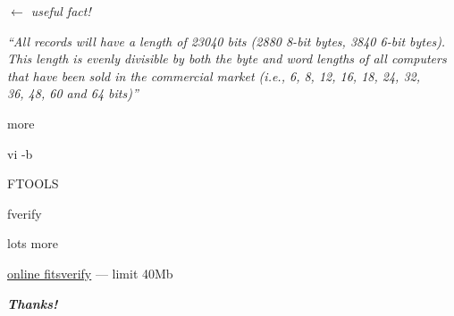 \documentclass[20pt,landscape]{foils}
\newif\ifrubric
\newcommand{\bhref}[2]{\href{#1}{{\color{blue}#2}}}
\begin{document}
\begin{list0}
\begin{list2}
\begin{list4}
            \hspace*{1em} {\color{darkred}\sl $\leftarrow$ useful fact!}
      \item[] \hspace*{1.5em}
              \begin{minipage}{25cm}
                {\sl\small\color{darkgrey}
                ``All records will have a length of 23040 bits
                  (2880 8-bit bytes, 3840 6-bit bytes).\\
                  This length is evenly divisible by both the byte and word
                  lengths of all computers \\
                  that have been sold in the commercial market
                  (i.e., 6, 8, 12, 16, 18, 24, 32, \\
                  36, 48, 60 and 64 bits)''}
              \end{minipage}
    \end{list4}
  \end{list2}
\end{list0}




\begin{list2}
  \item more
  \item vi -b
  \item FTOOLS
  \begin{list3}
    \item fverify 
    \item lots more
  \end{list3}
  \item \bhref{https://fits.gsfc.nasa.gov/fits_verify.html}{online fitsverify}
        --- limit 40Mb
\end{list2}


\vspace{0.2cm}
\begin{center}
  {\color{darkred}\Huge\bf\sl Thanks!}
\end{center}

\label{lastPage}

\ifrubric

\newcommand{\aobSlide}[1]{
\newpage
\rightfooter{}
\MyLogo{}
\begin{picture}(30,0)
  #1
\end{picture}
\bigword{AOB?}
}
\aobSlide{}

\fi
\end{document}
